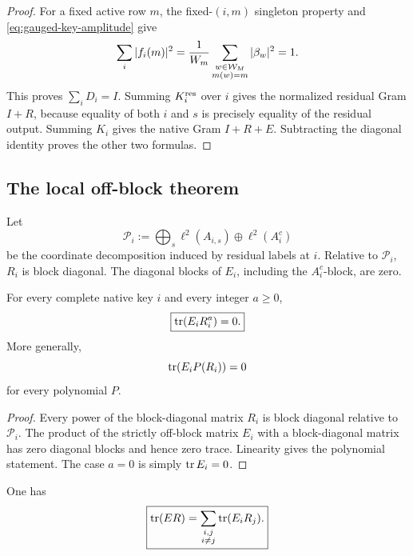 \begin{proof}
For a fixed active row \(m\), the fixed-\((i,m)\) singleton property and
\eqref{eq:gauged-key-amplitude} give
\[
 \sum_i|f_i(m)|^2
 =
 \frac1{W_m}
 \sum_{\substack{w\in\mathcal W_M\\m(w)=m}}|\beta_w|^2
 =1.
\]
This proves \(\sum_iD_i=I\).  Summing \(K_i^{\rm res}\) over \(i\) gives
the normalized residual Gram \(I+R\), because equality of both \(i\) and
\(s\) is precisely equality of the residual output.  Summing \(K_i\)
gives the native Gram \(I+R+E\).  Subtracting the diagonal identity proves
the other two formulas.
\end{proof}

\subsection{The local off-block theorem}

Let
\begin{equation}
 \mathscr P_i
 :=
 \bigoplus_s\ell^2(A_{i,s})
 \oplus\ell^2(A_i^c)
 \label{eq:residual-coordinate-partition}
\end{equation}
be the coordinate decomposition induced by residual labels at \(i\).
Relative to \(\mathscr P_i\), \(R_i\) is block diagonal.  The diagonal
blocks of \(E_i\), including the \(A_i^c\)-block, are zero.

\begin{theorem}
\label{thm:one-key-mixed-trace}
For every complete native key \(i\) and every integer \(a\ge0\),
\begin{equation}
 \boxed{\operatorname{tr}(E_iR_i^a)=0.}
 \label{eq:one-key-mixed-trace}
\end{equation}
More generally,
\begin{equation}
 \operatorname{tr}(E_iP(R_i))=0
 \label{eq:polynomial-local-vanishing}
\end{equation}
for every polynomial \(P\).
\end{theorem}

\begin{proof}
Every power of the block-diagonal matrix \(R_i\) is block diagonal relative
to \(\mathscr P_i\).  The product of the strictly off-block matrix \(E_i\)
with a block-diagonal matrix has zero diagonal blocks and hence zero trace.
Linearity gives the polynomial statement.  The case \(a=0\) is simply
\(\operatorname{tr} E_i=0\).
\end{proof}

\begin{corollary}
\label{cor:first-mixed-cross-key}
One has
\begin{equation}
 \boxed{
 \operatorname{tr}(ER)=\sum_{\substack{i,j\\i\ne j}}\operatorname{tr}(E_iR_j).}
 \label{eq:first-mixed-cross-key}
\end{equation}
\end{corollary}

